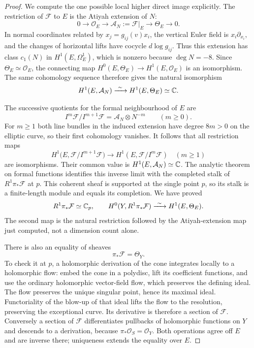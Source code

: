 \begin{proof}
We compute the one possible local higher direct image explicitly.
The restriction of $\mathcal F$ to $E$ is the Atiyah extension
of $N$:
\[
 0\longrightarrow\mathcal O_E
 \longrightarrow\mathcal A_N:=\mathcal F|_E
 \longrightarrow\Theta_E\longrightarrow0.
\]
In normal coordinates related by $x_j=g_{ij}(v)x_i$, the
vertical Euler field is $x_i\partial_{x_i}$, and the changes of
horizontal lifts have cocycle $d\log g_{ij}$.
Thus this extension has class $c_1(N)$ in
$H^1(E,\Omega^1_E)$, which is nonzero because $\deg N=-8$.
Since $\Theta_E\simeq\mathcal O_E$, the connecting map
$H^0(E,\Theta_E)\to H^1(E,\mathcal O_E)$ is an isomorphism.
The same cohomology sequence therefore gives the natural
isomorphism
\[
 H^1(E,\mathcal A_N)\xrightarrow{\ \sim\ }
 H^1(E,\Theta_E)\simeq\mathbb C.
\]

The successive quotients for the formal neighbourhood of $E$ are
\[
 I^m\mathcal F/I^{m+1}\mathcal F
     =\mathcal A_N\otimes N^{-m}\qquad(m\ge0).
\]
For $m\ge1$ both line bundles in the induced extension have
degree $8m>0$ on the elliptic curve, so their first cohomology
vanishes.  It follows that all restriction maps
\[
 H^1\bigl(E,\mathcal F/I^{m+1}\mathcal F\bigr)
 \longrightarrow H^1(E,\mathcal F/I^m\mathcal F)
 \quad(m\ge1)
\]
are isomorphisms.  Their common value is
$H^1(E,\mathcal A_N)\simeq\mathbb C$.
The analytic theorem on formal functions
\citep[Section~6, Hauptsatz~IIa, p.~59]{Grauert60push}
identifies this inverse limit with the completed stalk of
$R^1\pi_*\mathcal F$ at $p$.
This coherent sheaf is supported at the single point $p$,
so its stalk is a finite-length module and equals its completion.
We have proved
\[
 R^1\pi_*\mathcal F\simeq\mathbb C_p,
 \qquad
 H^0(Y,R^1\pi_*\mathcal F)
    \xrightarrow{\ \sim\ }H^1(E,\Theta_E).
\]
The second map is the natural restriction followed by the
Atiyah-extension map just computed, not a dimension count alone.

There is also an equality of sheaves
\[
 \pi_*\mathcal F=\Theta_Y.
\]
To check it at $p$, a holomorphic derivation of the cone
integrates locally to a holomorphic flow: embed the cone in a
polydisc, lift its coefficient functions, and use the ordinary
holomorphic vector-field flow, which preserves the defining ideal.
The flow preserves the unique singular point, hence its maximal
ideal.  Functoriality of the blow-up of that ideal lifts the flow
to the resolution, preserving the exceptional curve.
Its derivative is therefore a section of $\mathcal F$.
Conversely a section of $\mathcal F$ differentiates pullbacks
of holomorphic functions on $Y$ and descends to a derivation,
because $\pi_*\mathcal O_S=\mathcal O_Y$.
Both operations agree off $E$ and are inverse there; uniqueness
extends the equality over $E$.


\end{proof}
